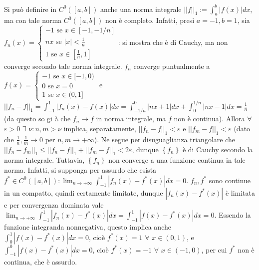 \documentclass{article}
\begin{document}
Si pu\`{o} definire in $C^{0}\left( \left[ a,b\right] \right) $ anche una
norma integrale $\left\vert \left\vert f\right\vert \right\vert
_{1}:=\int_{a}^{b}\left\vert f\left( x\right) \right\vert dx$, ma con tale
norma $C^{0}\left( \left[ a,b\right] \right) $ non \`{e} completo. Infatti,
presi $a=-1,b=1$, sia $f_{n}\left( x\right) =\left\{ 
\begin{array}{c}
-1\text{ se }x\in \left[ -1,-1/n\right] \\ 
nx\text{ se }\left\vert x\right\vert <\frac{1}{n} \\ 
1\text{ se }x\in \left[ \frac{1}{n},1\right]%
\end{array}%
\right. $: si mostra che \`{e} di Cauchy, ma non converge secondo tale norma
integrale. $f_{n}$ converge puntualmente a $f\left( x\right) =\left\{ 
\begin{array}{c}
-1\text{ se }x\in \lbrack -1,0) \\ 
0\text{ se }x=0 \\ 
1\text{ se }x\in (0,1]%
\end{array}%
\right. $ e $\left\vert \left\vert f_{n}-f\right\vert \right\vert
_{1}=\int_{-1}^{1}\left\vert f_{n}\left( x\right) -f\left( x\right)
\right\vert dx=\int_{-1/n}^{0}\left\vert nx+1\right\vert
dx+\int_{0}^{1/n}\left\vert nx-1\right\vert dx=\frac{1}{n}$ (da questo so gi%
\`{a} che $f_{n}\rightarrow f$ in norma integrale, ma $f$ non \`{e}
continua). Allora $\forall $ $\varepsilon >0$ $\exists $ $\nu :n,m>\nu $
implica, separatamente, $\left\vert \left\vert f_{n}-f\right\vert
\right\vert _{1}<\varepsilon $ e $\left\vert \left\vert f_{m}-f\right\vert
\right\vert _{1}<\varepsilon $ (dato che $\frac{1}{n},\frac{1}{m}\rightarrow
0$ per $n,m\rightarrow +\infty $). Ne segue per disuguaglianza triangolare
che $\left\vert \left\vert f_{n}-f_{m}\right\vert \right\vert _{1}\leq
\left\vert \left\vert f_{n}-f\right\vert \right\vert _{1}+\left\vert
\left\vert f_{m}-f\right\vert \right\vert _{1}<2\varepsilon $, dunque $%
\left\{ f_{n}\right\} $ \`{e} di Cauchy secondo la norma integrale.
Tuttavia, $\left\{ f_{n}\right\} $ non converge a una funzione continua in
tale norma. Infatti, si supponga per assurdo che esista $f^{\ast }\in
C^{0}\left( \left[ a,b\right] \right) :\lim_{n\rightarrow +\infty
}\int_{-1}^{1}\left\vert f_{n}\left( x\right) -f^{\ast }\left( x\right)
\right\vert dx=0$. $f_{n},f^{\ast }$ sono continue in un compatto, quindi
certamente limitate, dunque $\left\vert f_{n}\left( x\right) -f^{\ast
}\left( x\right) \right\vert $ \`{e} limitata e per convergenza dominata
vale $\lim_{n\rightarrow +\infty }\int_{-1}^{1}\left\vert f_{n}\left(
x\right) -f^{\ast }\left( x\right) \right\vert dx=\int_{-1}^{1}\left\vert
f\left( x\right) -f^{\ast }\left( x\right) \right\vert dx=0$. Essendo la
funzione integranda nonnegativa, questo implica anche $\int_{0}^{1}\left%
\vert f\left( x\right) -f^{\ast }\left( x\right) \right\vert dx=0$, cio\`{e} 
$f^{\ast }\left( x\right) =1$ $\forall $ $x\in (0,1)$, e $%
\int_{-1}^{0}\left\vert f\left( x\right) -f^{\ast }\left( x\right)
\right\vert dx=0$, cio\`{e} $f^{\ast }\left( x\right) =-1$ $\forall $ $x\in
\left( -1,0\right) $, per cui $f^{\ast }$ non \`{e} continua, che \`{e}
assurdo.
\end{document}
